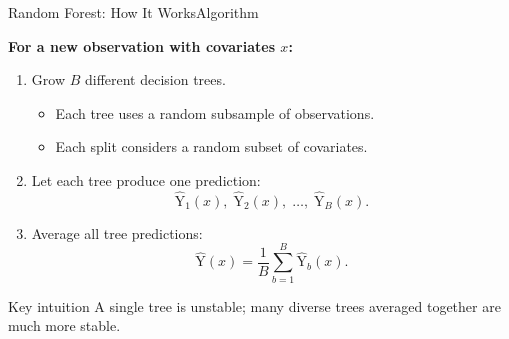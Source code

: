 \documentclass[hyperref={pdfpagelabels=false}]{beamer}
\begin{document}
\begin{frame}{Random Forest: How It Works}{Algorithm}

\textbf{For a new observation with covariates $x$:}

\vspace{0.2cm}

\begin{enumerate}
  \item Grow $B$ different decision trees.
  \vspace{0.15cm}
  \begin{itemize}
    \item Each tree uses a random subsample of observations.
    \item Each split considers a random subset of covariates.
  \end{itemize}

  \vspace{0.2cm}
  \item Let each tree produce one prediction:
  \[
    \hat{\mathrm{Y}}_1(x),\;
    \hat{\mathrm{Y}}_2(x),\;
    \ldots,\;
    \hat{\mathrm{Y}}_B(x).
  \]

  \vspace{0.2cm}
  \item Average all tree predictions:
  \[
    \hat{\mathrm{Y}}(x)
    =
    \frac{1}{B}\sum_{b=1}^{B}\hat{\mathrm{Y}}_b(x).
  \]
\end{enumerate}

\vspace{0.1cm}

\begin{block}{Key intuition}
A single tree is unstable; many diverse trees averaged together are much more stable.
\end{block}

\end{frame}
\end{document}

